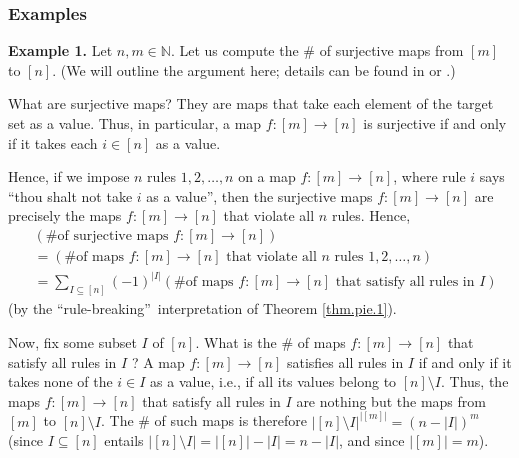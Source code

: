 \subsubsection{\label{subsec.sign.pie.exas}Examples}

\textbf{Example 1.} Let $n,m\in\mathbb{N}$. Let us compute the \# of
surjective maps from $\left[  m\right]  $ to $\left[  n\right]  $. (We will
outline the argument here; details can be found in \cite[\S 7.8.2]{20f} or
\cite[\S 2.9.4]{19fco}.)

What are surjective maps? They are maps that take each element of the target
set as a value. Thus, in particular, a map $f:\left[  m\right]  \rightarrow
\left[  n\right]  $ is surjective if and only if it takes each $i\in\left[
n\right]  $ as a value.

Hence, if we impose $n$ rules $1,2,\ldots,n$ on a map $f:\left[  m\right]
\rightarrow\left[  n\right]  $, where rule $i$ says \textquotedblleft thou
shalt not take $i$ as a value\textquotedblright, then the surjective maps
$f:\left[  m\right]  \rightarrow\left[  n\right]  $ are precisely the maps
$f:\left[  m\right]  \rightarrow\left[  n\right]  $ that violate all $n$
rules. Hence,%
\begin{align*}
&  \left(  \text{\# of surjective maps }f:\left[  m\right]  \rightarrow\left[
n\right]  \right) \\
&  =\left(  \text{\# of maps }f:\left[  m\right]  \rightarrow\left[  n\right]
\text{ that violate all }n\text{ rules }1,2,\ldots,n\right) \\
&  =\sum_{I\subseteq\left[  n\right]  }\left(  -1\right)  ^{\left\vert
I\right\vert }\left(  \text{\# of maps }f:\left[  m\right]  \rightarrow\left[
n\right]  \text{ that satisfy all rules in }I\right)
\end{align*}
(by the \textquotedblleft rule-breaking\textquotedblright\ interpretation of
Theorem \ref{thm.pie.1}).

Now, fix some subset $I$ of $\left[  n\right]  $. What is the \# of maps
$f:\left[  m\right]  \rightarrow\left[  n\right]  $ that satisfy all rules in
$I$ ? A map $f:\left[  m\right]  \rightarrow\left[  n\right]  $ satisfies all
rules in $I$ if and only if it takes none of the $i\in I$ as a value, i.e., if
all its values belong to $\left[  n\right]  \setminus I$. Thus, the maps
$f:\left[  m\right]  \rightarrow\left[  n\right]  $ that satisfy all rules in
$I$ are nothing but the maps from $\left[  m\right]  $ to $\left[  n\right]
\setminus I$. The \# of such maps is therefore $\left\vert \left[  n\right]
\setminus I\right\vert ^{\left\vert \left[  m\right]  \right\vert }=\left(
n-\left\vert I\right\vert \right)  ^{m}$ (since $I\subseteq\left[  n\right]  $
entails $\left\vert \left[  n\right]  \setminus I\right\vert =\left\vert
\left[  n\right]  \right\vert -\left\vert I\right\vert =n-\left\vert
I\right\vert $, and since $\left\vert \left[  m\right]  \right\vert =m$).

